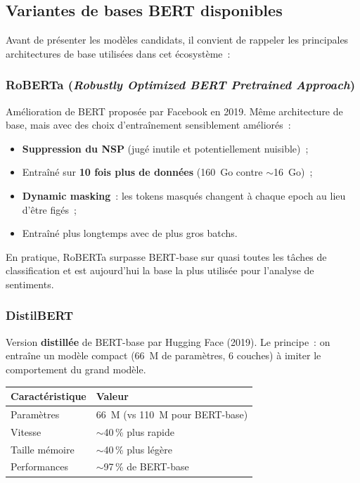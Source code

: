 \documentclass[12pt,a4paper]{article}
\begin{document}
\subsection{Variantes de bases BERT disponibles}

Avant de présenter les modèles candidats, il convient de rappeler les principales
architectures de base utilisées dans cet écosystème~:

\subsubsection{RoBERTa (\textit{Robustly Optimized BERT Pretrained Approach})}

Amélioration de BERT proposée par Facebook en 2019. Même architecture de base, mais
avec des choix d'entraînement sensiblement améliorés~:
\begin{itemize}[leftmargin=1.5cm]
  \item \textbf{Suppression du NSP} (jugé inutile et potentiellement nuisible)~;
  \item Entraîné sur \textbf{10 fois plus de données} (160~Go contre $\sim$16~Go)~;
  \item \textbf{Dynamic masking}~: les tokens masqués changent à chaque epoch au lieu
    d'être figés~;
  \item Entraîné plus longtemps avec de plus gros batchs.
\end{itemize}
En pratique, RoBERTa surpasse BERT-base sur quasi toutes les tâches de classification
et est aujourd'hui la base la plus utilisée pour l'analyse de sentiments.

\subsubsection{DistilBERT}

Version \textbf{distillée} de BERT-base par Hugging Face (2019). Le principe~: on
entraîne un modèle compact (66~M de paramètres, 6 couches) à imiter le comportement
du grand modèle.

\begin{center}
\begin{tabular}{@{}ll@{}}
  \toprule
  Caractéristique & Valeur \\
  \midrule
  Paramètres & 66~M (vs 110~M pour BERT-base) \\
  Vitesse & $\sim$40\,\% plus rapide \\
  Taille mémoire & $\sim$40\,\% plus légère \\
  Performances & $\sim$97\,\% de BERT-base \\
  \bottomrule
\end{tabular}
\end{center}
\end{document}
